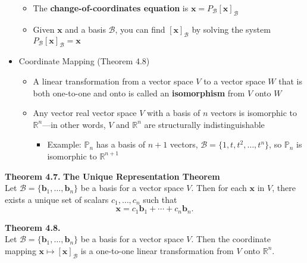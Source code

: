 \documentclass[10pt]{book}
\newenvironment{boxthm}{\begin{mdframed}[backgroundcolor=gray!30,nobreak=true]}{\end{mdframed}}
\newcommand{\R}{\mathbb{R}}
\newcommand{\Poly}{\mathbb{P}}
\newcommand{\B}{\mathscr{B}}
\newcommand{\vect}[1]{\ensuremath{\boldsymbol{\mathbf{#1}}}}
\newcommand{\vectset}[3][v]{\{\vect{#1}_{#2},\ldots,\vect{#1}_{#3}\}}
\newcommand{\vectB}[1][x]{[\vect{#1}]_\B}
\begin{document}
\begin{itemize}
\begin{itemize}
			\item The \textbf{change-of-coordinates equation} is $\vect{x}=P_\B\vectB$
			\item Given $\vect{x}$ and a basis $\B$, you can find $\vectB$ by solving the system $P_\B\vectB=\vect{x}$
		\end{itemize}
	\item Coordinate Mapping (Theorem 4.8)
		\begin{itemize}
			\item A linear transformation from a vector space $V$ to a vector space $W$ that is both one-to-one and onto is called an \textbf{isomorphism} from $V$ onto $W$
			\item Any vector real vector space $V$ with a basis of $n$ vectors is isomorphic to $\R^n$---in other words, $V$ and $\R^n$ are structurally indistinguishable
			\begin{itemize}
				\item Example: $\Poly_n$ has a basis of $n+1$ vectors, $\B=\{1,t,t^2,\ldots,t^n\}$, so $\Poly_n$ is isomorphic to $\R^{n+1}$
			\end{itemize}
		\end{itemize}
\end{itemize}

\begin{boxthm}
	\textbf{Theorem 4.7.}
	\textbf{The Unique Representation Theorem} \\
	Let $\B=\vectset[b]{1}{n}$ be a basis for a vector space $V$. Then for each $\vect{x}$ in $V$, there exists a unique set of scalars $c_1,\ldots,c_n$ such that $$ \vect{x} = c_1\vect{b}_1 + \cdots + c_n\vect{b}_n. $$
\end{boxthm}
\begin{boxthm}
	\textbf{Theorem 4.8.} \\
	Let $\B=\vectset[b]{1}{n}$ be a basis for a vector space $V$. Then the coordinate mapping $\vect{x}\mapsto\vectB$ is a one-to-one linear transformation from $V$ onto $\R^n$.
\end{boxthm}


\newpage


\end{document}

